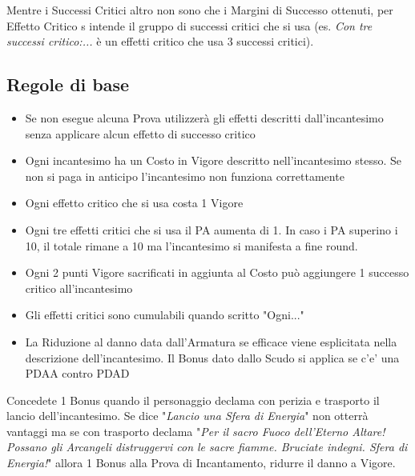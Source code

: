 \documentclass[12pt,a4paper,twoside,openany]{book}
\begin{document}
\begin{multicols}{2}
Mentre i Successi Critici altro non sono che i Margini di Successo ottenuti, per Effetto Critico s intende il gruppo di successi critici che si usa (es. \textit{Con tre successi critico:...} è un effetti critico che usa 3 successi critici).

\subsection{Regole di base}\label{magieregoledibase}

\begin{itemize}

\item 
Se non esegue alcuna Prova utilizzerà gli effetti descritti dall'incantesimo senza applicare alcun effetto di successo critico

\item 
Ogni incantesimo ha un Costo in Vigore descritto nell'incantesimo stesso. Se non si paga in anticipo l'incantesimo non funziona correttamente

\item 
Ogni effetto critico che si usa costa 1 Vigore

\item 
Ogni tre effetti critici che si usa il PA aumenta di 1. In caso i PA superino i 10, il totale rimane a 10 ma l'incantesimo si manifesta a fine round.

\item 
Ogni 2 punti Vigore sacrificati in aggiunta al Costo può aggiungere 1 successo critico all'incantesimo

\item 
Gli effetti critici sono cumulabili quando scritto "Ogni..."

\item 
La Riduzione al danno data dall'Armatura se efficace viene esplicitata nella descrizione dell'incantesimo. Il Bonus dato dallo Scudo si applica se c'e' una PDAA contro PDAD

\end{itemize}

\begin{changemargin}{0.3cm}{0.3cm}\begin{narratore}
Concedete 1 Bonus quando il personaggio declama con perizia e trasporto il lancio dell'incantesimo. Se dice "\textit{Lancio una Sfera di Energia}" non otterrà vantaggi ma se con trasporto declama "\textit{Per il sacro Fuoco dell'Eterno Altare! Possano gli Arcangeli distruggervi con le sacre fiamme. Bruciate indegni. Sfera di Energia!}" allora 1 Bonus alla Prova di Incantamento, ridurre il danno a Vigore.
\end{narratore}\end{changemargin}


\end{multicols}
\end{document}
